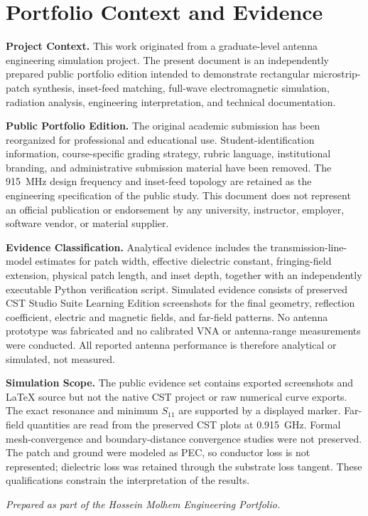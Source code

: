 \chapter*{Portfolio Context and Evidence}
\thispagestyle{fancy}

\noindent
\textbf{Project Context.}
This work originated from a graduate-level antenna engineering simulation project.
The present document is an independently prepared public portfolio edition intended
to demonstrate rectangular microstrip-patch synthesis, inset-feed matching,
full-wave electromagnetic simulation, radiation analysis, engineering interpretation,
and technical documentation.

\vspace{0.5em}

\noindent
\textbf{Public Portfolio Edition.}
The original academic submission has been reorganized for professional and educational
use. Student-identification information, course-specific grading strategy, rubric
language, institutional branding, and administrative submission material have been
removed. The 915~MHz design frequency and inset-feed topology are retained as the
engineering specification of the public study. This document does not represent an
official publication or endorsement by any university, instructor, employer, software
vendor, or material supplier.

\vspace{0.5em}

\noindent
\textbf{Evidence Classification.}
Analytical evidence includes the transmission-line-model estimates for patch width,
effective dielectric constant, fringing-field extension, physical patch length, and
inset depth, together with an independently executable Python verification script.
Simulated evidence consists of preserved CST Studio Suite Learning Edition screenshots
for the final geometry, reflection coefficient, electric and magnetic fields, and
far-field patterns. No antenna prototype was fabricated and no calibrated VNA or
antenna-range measurements were conducted. All reported antenna performance is
therefore analytical or simulated, not measured.

\vspace{0.5em}

\noindent
\textbf{Simulation Scope.}
The public evidence set contains exported screenshots and LaTeX source but not the
native CST project or raw numerical curve exports. The exact resonance and minimum
$S_{11}$ are supported by a displayed marker. Far-field quantities are read from the
preserved CST plots at 0.915~GHz. Formal mesh-convergence and boundary-distance
convergence studies were not preserved. The patch and ground were modeled as PEC, so
conductor loss is not represented; dielectric loss was retained through the substrate
loss tangent. These qualifications constrain the interpretation of the results.

\vfill

\begin{center}
    \textit{Prepared as part of the Hossein Molhem Engineering Portfolio.}
\end{center}

